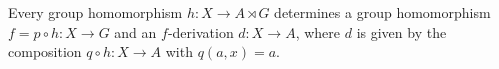 Every group homomorphism $h : X \to A \rtimes G$ determines a group homomorphism $f = p \circ h : X \to G$ and an $f$-derivation $d : X \to A$, where $d$ is given by the composition $q \circ h : X \to A$ with $q(a,x) = a$.
